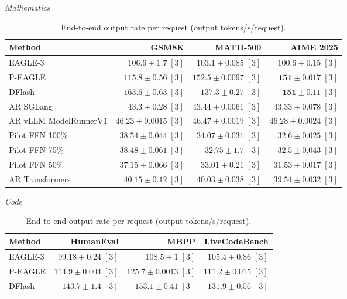 \begin{table}[!htp]
\centering\small
\setlength{\tabcolsep}{3pt}
\caption{End-to-end output rate per request (output tokens/s/request).}
\label{tab:appendix-metric-request-speed-none}
\textit{Mathematics}\par\smallskip
\begin{tabular}{@{}>{\raggedright\arraybackslash}p{3.7cm}rrr@{}}
\toprule
Method & GSM8K & MATH-500 & AIME 2025 \\
\midrule
EAGLE-3 & \(106.6 \pm 1.7\;[3]\) & \(103.1 \pm 0.085\;[3]\) & \(100.6 \pm 0.15\;[3]\) \\
P-EAGLE & \(115.8 \pm 0.56\;[3]\) & \(\mathbf{152.5} \pm 0.0097\;[3]\) & \(\mathbf{151} \pm 0.017\;[3]\) \\
DFlash & \(\mathbf{163.6} \pm 0.63\;[3]\) & \(137.3 \pm 0.27\;[3]\) & \(\mathbf{151} \pm 0.11\;[3]\) \\
AR \textperiodcentered{} SGLang & \(43.3 \pm 0.28\;[3]\) & \(43.44 \pm 0.0061\;[3]\) & \(43.33 \pm 0.078\;[3]\) \\
AR \textperiodcentered{} vLLM ModelRunnerV1 & \(46.23 \pm 0.0015\;[3]\) & \(46.47 \pm 0.0019\;[3]\) & \(46.28 \pm 0.0024\;[3]\) \\
Pilot FFN 100\% & \(38.54 \pm 0.044\;[3]\) & \(34.07 \pm 0.031\;[3]\) & \(32.6 \pm 0.025\;[3]\) \\
Pilot FFN 75\% & \(38.48 \pm 0.061\;[3]\) & \(32.75 \pm 1.7\;[3]\) & \(32.5 \pm 0.043\;[3]\) \\
Pilot FFN 50\% & \(37.15 \pm 0.066\;[3]\) & \(33.01 \pm 0.21\;[3]\) & \(31.53 \pm 0.017\;[3]\) \\
AR \textperiodcentered{} Transformers & \(40.15 \pm 0.12\;[3]\) & \(40.03 \pm 0.038\;[3]\) & \(39.54 \pm 0.032\;[3]\) \\
\bottomrule
\end{tabular}\par\medskip
\textit{Code}\par\smallskip
\begin{tabular}{@{}>{\raggedright\arraybackslash}p{3.7cm}rrr@{}}
\toprule
Method & HumanEval & MBPP & LiveCodeBench \\
\midrule
EAGLE-3 & \(99.18 \pm 0.24\;[3]\) & \(108.5 \pm 1\;[3]\) & \(105.4 \pm 0.86\;[3]\) \\
P-EAGLE & \(114.9 \pm 0.004\;[3]\) & \(125.7 \pm 0.0013\;[3]\) & \(111.2 \pm 0.015\;[3]\) \\
DFlash & \(\mathbf{143.7} \pm 1.4\;[3]\) & \(\mathbf{153.1} \pm 0.41\;[3]\) & \(\mathbf{131.9} \pm 0.56\;[3]\) \\

\end{tabular}
\end{table}
